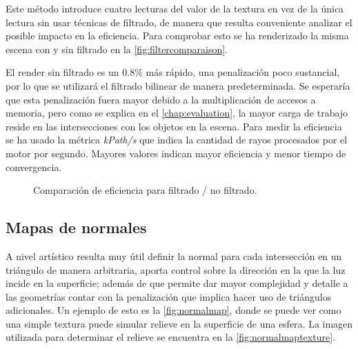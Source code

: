 Este método introduce cuatro lecturas del valor de la textura en vez de la única lectura sin usar técnicas de filtrado, de manera que resulta conveniente analizar el posible impacto en la eficiencia. Para comprobar esto se ha renderizado la misma escena con y sin filtrado en la \autoref{fig:filtercomparaison}. 
	
El render sin filtrado es un 0.8\% más rápido, una penalización poco sustancial, por lo que se utilizará el filtrado bilinear de manera predeterminada. Se esperaría que esta penalización fuera mayor debido a la multiplicación de accesos a memoria, pero como se explica en el \autoref{chap:evaluation}, la mayor carga de trabajo reside en las intersecciones con los objetos en la escena. Para medir la eficiencia se ha usado la métrica \emph{kPath/s} que indica la cantidad de rayos procesados por el motor por segundo. Mayores valores indican mayor eficiencia y menor tiempo de convergencia. 

\begin{figure}[H]
\centering
{}
\caption{Comparación de eficiencia para filtrado / no filtrado.}
\label{fig:filtercomparaison}
\end{figure}
	
\subsection{Mapas de normales}
		
A nivel artístico resulta muy útil definir la normal para cada intersección en un triángulo de manera arbitraria, aporta control sobre la dirección en la que la luz incide en la superficie; además de que permite dar mayor complejidad y detalle a las geometrías contar con la penalización que implica hacer uso de triángulos adicionales. Un ejemplo de esto es la \autoref{fig:normalmap}, donde se puede ver como una simple textura puede simular relieve en la superficie de una esfera. La imagen utilizada para determinar el relieve se encuentra en la \autoref{fig:normalmaptexture}. 
	
